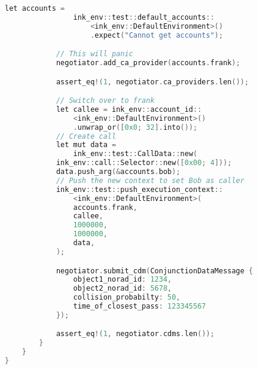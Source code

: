 \begin{lstlisting}[label={source},language=c,caption={Smart Contract}]
            let accounts =
                ink_env::test::default_accounts::
                    <ink_env::DefaultEnvironment>()
                    .expect("Cannot get accounts");

            // This will panic
            negotiator.add_ca_provider(accounts.frank);

            assert_eq!(1, negotiator.ca_providers.len());

            // Switch over to frank
            let callee = ink_env::account_id::
                <ink_env::DefaultEnvironment>()
                .unwrap_or([0x0; 32].into());
            // Create call
            let mut data =
                ink_env::test::CallData::new(
            ink_env::call::Selector::new([0x00; 4]));
            data.push_arg(&accounts.bob);
            // Push the new context to set Bob as caller
            ink_env::test::push_execution_context::
                <ink_env::DefaultEnvironment>(
                accounts.frank,
                callee,
                1000000,
                1000000,
                data,
            );

            negotiator.submit_cdm(ConjunctionDataMessage {
                object1_norad_id: 1234,
                object2_norad_id: 5678,
                collision_probabilty: 50,
                time_of_closest_pass: 123345567
            });

            assert_eq!(1, negotiator.cdms.len());
        }
    }
}
       
\end{lstlisting}